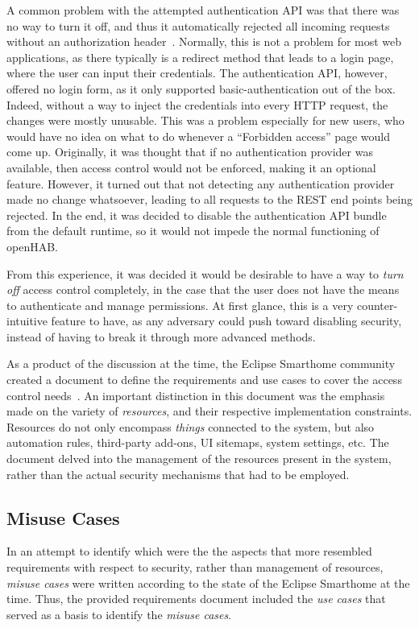 \documentclass[12pt]{article}
\begin{document}
A common problem with the attempted authentication API was that there was no way to turn it off, and thus it automatically rejected all incoming requests without an authorization header~\cite{esh_05}. Normally, this is not a problem for most web applications, as there typically is a redirect method that leads to a login page, where the user can input their credentials. The authentication API, however, offered no login form, as it only supported basic-authentication out of the box. Indeed, without a way to inject the credentials into every HTTP request, the changes were mostly unusable. This was a problem especially for new users, who would have no idea on what to do whenever a ``Forbidden access'' page would come up. Originally, it was thought that if no authentication provider was available, then access control would not be enforced, making it an optional feature. However, it turned out that not detecting any authentication provider made no change whatsoever, leading to all requests to the REST end points being rejected. In the end, it was decided to disable the authentication API bundle from the default runtime, so it would not impede the normal functioning of openHAB.

From this experience, it was decided it would be desirable to have a way to \emph{turn off} access control completely, in the case that the user does not have the means to authenticate and manage permissions. At first glance, this is a very counter-intuitive feature to have, as any adversary could push toward disabling security, instead of having to break it through more advanced methods. 

As a product of the discussion at the time, the Eclipse Smarthome community created a document to define the requirements and use cases to cover the access control needs~\cite{esh_06}. An important distinction in this document was the emphasis made on the variety of \emph{resources}, and their respective implementation constraints. Resources do not only encompass \emph{things} connected to the system, but also automation rules, third-party add-ons, UI sitemaps, system settings, etc. The document delved into the management of the resources present in the system, rather than the actual security mechanisms that had to be employed. 

\subsection{Misuse Cases}

In an attempt to identify which were the the aspects that more resembled requirements with respect to security, rather than management of resources, \emph{misuse cases} were written according to the state of the Eclipse Smarthome at the time. Thus, the provided requirements document included the \emph{use cases} that served as a basis to identify the \emph{misuse cases}. 
\end{document}
